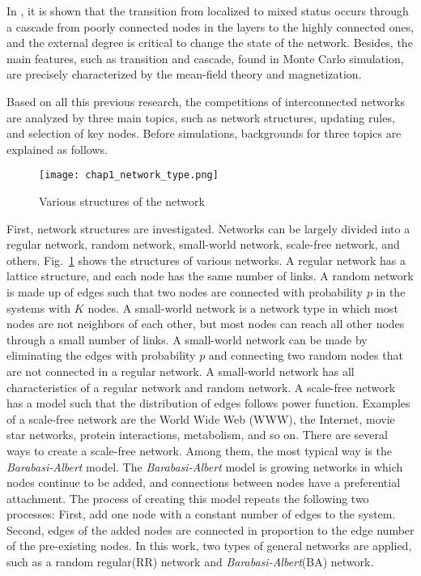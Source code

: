 In \parencite{gomez2015}, it is shown that the transition from localized to mixed status occurs through a cascade from poorly connected nodes in the layers to the highly connected ones, and the external degree is critical to change the state of the network. Besides, the main features, such as transition and cascade, found in Monte Carlo simulation, are precisely characterized by the mean-field theory and magnetization\parencite{alvarez2016, diep2017, amato2017, gomez2015}. 

Based on all this previous research, the competitions of interconnected networks are analyzed by three main topics, such as network structures, updating rules, and selection of key nodes. Before simulations, backgrounds for three topics are explained as follows. 
\begin{figure}[!htb]
	\centering
	\texttt{[image: chap1\_network\_type.png]}
	\caption{Various structures of the network}
	\label{chap1_network_type}
\end{figure}
First, network structures are investigated. Networks can be largely divided into a regular network, random network\parencite{erdos1960}, small-world network\parencite{watts1998}, scale-free network\parencite{barabasi1999}, and others. Fig.~\ref{chap1_network_type} shows the structures of various networks. A regular network has a lattice structure, and each node has the same number of links. A random network is made up of edges such that two nodes are connected with probability $p$ in the systems with $K$ nodes. A small-world network is a network type in which most nodes are not neighbors of each other, but most nodes can reach all other nodes through a small number of links. A small-world network can be made by eliminating the edges with probability $p$ and connecting two random nodes that are not connected in a regular network. A small-world network has all characteristics of a regular network and random network. A scale-free network has a model such that the distribution of edges follows power function. Examples of a scale-free network are the World Wide Web (WWW), the Internet, movie star networks, protein interactions, metabolism, and so on. There are several ways to create a scale-free network. Among them, the most typical way is the \textit{Barabasi-Albert} model. The \textit{Barabasi-Albert} model is growing networks in which nodes continue to be added, and connections between nodes have a preferential attachment. The process of creating this model repeats the following two processes: First, add one node with a constant number of edges to the system. Second, edges of the added nodes are connected in proportion to the edge number of the pre-existing nodes. In this work, two types of general networks are applied, such as a random regular(RR) network and \textit{Barabasi-Albert}(BA) network. 

